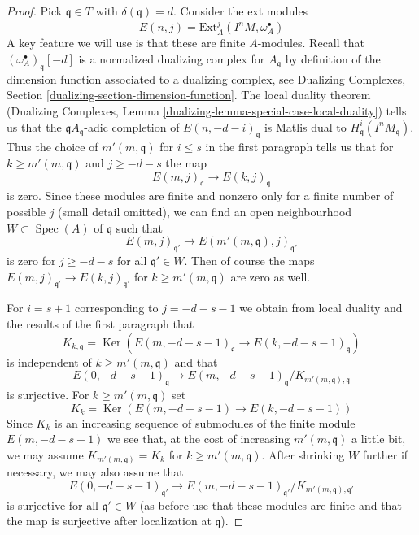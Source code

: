 \documentclass{stacks-project}
\theoremstyle{plain}
\theoremstyle{definition}
\theoremstyle{remark}
\numberwithin{equation}{subsection}
\def\Spec{\mathop{\mathrm{Spec}}}
\def\Ker{\mathop{\mathrm{Ker}}}
\begin{document}
\begin{proof}
\medskip\noindent
Pick $\mathfrak q \in T$ with $\delta(\mathfrak q) = d$.
Consider the ext modules
$$
E(n, j) = \text{Ext}^j_A(I^nM, \omega_A^\bullet)
$$
A key feature we will use is that these are finite $A$-modules.
Recall that $(\omega_A^\bullet)_\mathfrak q[-d]$ is a normalized
dualizing complex for $A_\mathfrak q$ by definition of the
dimension function associated to a dualizing complex, see
Dualizing Complexes, Section \ref{dualizing-section-dimension-function}.
The local duality theorem (Dualizing Complexes, Lemma
\ref{dualizing-lemma-special-case-local-duality}) tells us that
the $\mathfrak qA_\mathfrak q$-adic completion of
$E(n, -d - i)_\mathfrak q$ is Matlis dual to
$H^i_\mathfrak q(I^nM_\mathfrak q)$. Thus the choice of
$m'(m, \mathfrak q)$ for $i \leq s$ in the first paragraph tells us that
for $k \geq m'(m, \mathfrak q)$ and $j \geq -d - s$ the map
$$
E(m, j)_\mathfrak q \to E(k, j)_\mathfrak q
$$
is zero. Since these modules are finite and nonzero only
for a finite number of possible $j$ (small detail omitted),
we can find an open neighbourhood $W \subset \Spec(A)$ of $\mathfrak q$
such that
$$
E(m, j)_{\mathfrak q'} \to E(m'(m, \mathfrak q), j)_{\mathfrak q'}
$$
is zero for $j \geq -d - s$ for all $\mathfrak q' \in W$.
Then of course the maps $E(m, j)_{\mathfrak q'} \to E(k, j)_{\mathfrak q'}$
for $k \geq m'(m, \mathfrak q)$ are zero as well.

\medskip\noindent
For $i = s + 1$ corresponding to $j = - d - s - 1$ we obtain
from local duality and the results of the first paragraph that
$$
K_{k, \mathfrak q} =
\Ker(E(m, -d - s - 1)_\mathfrak q \to E(k, -d - s - 1)_\mathfrak q)
$$
is independent of $k \geq m'(m, \mathfrak q)$ and that
$$
E(0, -d - s - 1)_\mathfrak q \to
E(m, -d - s - 1)_\mathfrak q/K_{m'(m, \mathfrak q), \mathfrak q}
$$
is surjective. For $k \geq m'(m, \mathfrak q)$ set
$$
K_k = \Ker(E(m, -d - s - 1) \to E(k, -d - s - 1))
$$
Since $K_k$ is an increasing sequence of submodules of the finite
module $E(m, -d - s - 1)$ we see that, at the cost of increasing
$m'(m, \mathfrak q)$ a little bit, we may assume
$K_{m'(m, \mathfrak q)} = K_k$ for $k \geq m'(m, \mathfrak q)$.
After shrinking $W$ further if necessary, we may also assume that
$$
E(0, -d - s - 1)_{\mathfrak q'} \to
E(m, -d - s - 1)_{\mathfrak q'}/K_{m'(m, \mathfrak q), \mathfrak q'}
$$
is surjective for all $\mathfrak q' \in W$ (as before use that
these modules are finite
and that the map is surjective after localization at $\mathfrak q$).


\end{proof}
\end{document}

